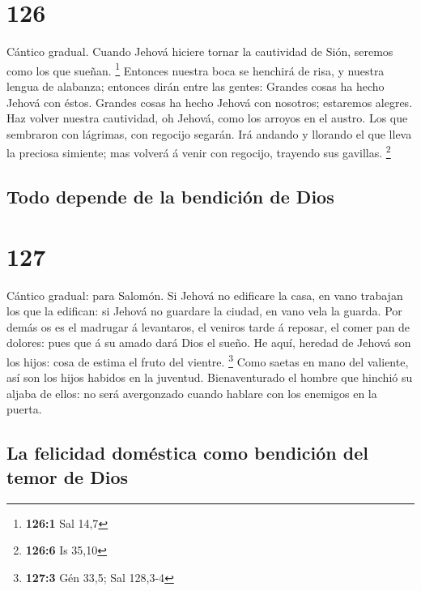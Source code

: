 \hypertarget{section-125}{%
\section{126}\label{section-125}}

 Cántico gradual. Cuando Jehová hiciere tornar la cautividad
de Sión, seremos como los que sueñan. \footnote{\textbf{126:1} Sal 14,7}
 Entonces nuestra boca se henchirá de risa, y nuestra lengua
de alabanza; entonces dirán entre las gentes: Grandes cosas ha hecho
Jehová con éstos.  Grandes cosas ha hecho Jehová con
nosotros; estaremos alegres.  Haz volver nuestra cautividad,
oh Jehová, como los arroyos en el austro.  Los que sembraron
con lágrimas, con regocijo segarán.  Irá andando y llorando
el que lleva la preciosa simiente; mas volverá á venir con regocijo,
trayendo sus gavillas. \footnote{\textbf{126:6} Is 35,10}

\hypertarget{todo-depende-de-la-bendiciuxf3n-de-dios}{%
\subsection{Todo depende de la bendición de
Dios}\label{todo-depende-de-la-bendiciuxf3n-de-dios}}

\hypertarget{section-126}{%
\section{127}\label{section-126}}

 Cántico gradual: para Salomón. Si Jehová no edificare la
casa, en vano trabajan los que la edifican: si Jehová no guardare la
ciudad, en vano vela la guarda.  Por demás os es el madrugar
á levantaros, el veniros tarde á reposar, el comer pan de dolores: pues
que á su amado dará Dios el sueño.  He aquí, heredad de
Jehová son los hijos: cosa de estima el fruto del vientre. \footnote{\textbf{127:3}
  Gén 33,5; Sal 128,3-4}  Como saetas en mano del valiente,
así son los hijos habidos en la juventud.  Bienaventurado el
hombre que hinchió su aljaba de ellos: no será avergonzado cuando
hablare con los enemigos en la puerta.

\hypertarget{la-felicidad-domuxe9stica-como-bendiciuxf3n-del-temor-de-dios}{%
\subsection{La felicidad doméstica como bendición del temor de
Dios}\label{la-felicidad-domuxe9stica-como-bendiciuxf3n-del-temor-de-dios}}

